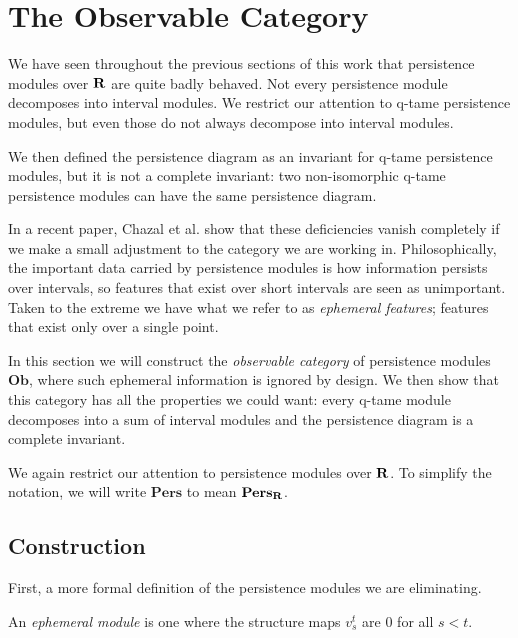 \newcommand{\Pers}{\mathbf{Pers}}
\renewcommand{\Ob}{\mathbf{Ob}}
\newcommand{\Eph}{\mathbf{Eph}}

\section{The Observable Category}
\label{section-observable}

We have seen throughout the previous sections of this work that persistence modules over $\mathbf{R}$ are quite badly behaved. Not every persistence module decomposes into interval modules. We restrict our attention to q-tame persistence modules, but even those do not always decompose into interval modules.

We then defined the persistence diagram as an invariant for q-tame persistence modules, but it is not a complete invariant: two non-isomorphic q-tame persistence modules can have the same persistence diagram.

In a recent paper, Chazal et al. \cite{chazal2014observable} show that these deficiencies vanish completely if we make a small adjustment to the category we are working in. Philosophically, the important data carried by persistence modules is how information persists over intervals, so features that exist over short intervals are seen as unimportant. Taken to the extreme we have what we refer to as \emph{ephemeral features}; features that exist only over a single point.

In this section we will construct the \emph{observable category} of persistence modules $\Ob$, where such ephemeral information is ignored by design. We then show that this category has all the properties we could want: every q-tame module decomposes into a sum of interval modules and the persistence diagram is a complete invariant.

We again restrict our attention to persistence modules over $\mathbf{R}$. To simplify the notation, we will write $\Pers$ to mean $\mathbf{Pers}_{\mathbf{R}}$.

\subsection{Construction}

First, a more formal definition of the persistence modules we are eliminating.

\begin{definition}
An \emph{ephemeral module} is one where the structure maps $v_s^t$ are 0 for all $s < t$.
\end{definition}

